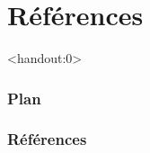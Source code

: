 \section{Références}

\begin{frame}<handout:0>
  \frametitle{Plan}
  \tableofcontents[currentsection,subsectionstyle=hide]
\end{frame}

\nocite{*}


\begin{frame}[allowframebreaks]
  \frametitle{Références}
  
\end{frame}

\begin{frame}
  \vfill
  \centering
  \vfill
\end{frame}
